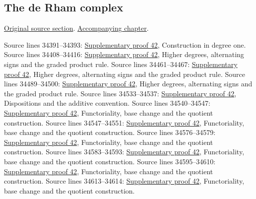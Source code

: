 \subsection{The de Rham complex}
\hypertarget{algebra-source-section-de-rham-complex}{}
\noindent\href{https://github.com/stacks/stacks-project/blob/a04446e57ec1fbc252a871afcec7752fb2807b14/algebra.tex\#L34387}{Original source section}. \href{algebra.pdf\#nameddest=section-de-rham-complex}{Accompanying chapter}.

\begin{AlgebraSourceRoutes}
 Source lines 34391--34393: \hyperlink{algebra_de_rham_notes_20260928}{Supplementary proof 42}, Construction in degree one.
 Source lines 34408--34416: \hyperlink{algebra_de_rham_notes_20260928}{Supplementary proof 42}, Higher degrees, alternating signs and the graded product rule.
 Source lines 34461--34467: \hyperlink{algebra_de_rham_notes_20260928}{Supplementary proof 42}, Higher degrees, alternating signs and the graded product rule.
 Source lines 34489--34500: \hyperlink{algebra_de_rham_notes_20260928}{Supplementary proof 42}, Higher degrees, alternating signs and the graded product rule.
 Source lines 34533--34537: \hyperlink{algebra_de_rham_notes_20260928}{Supplementary proof 42}, Dispositions and the additive convention.
 Source lines 34540--34547: \hyperlink{algebra_de_rham_notes_20260928}{Supplementary proof 42}, Functoriality, base change and the quotient construction.
 Source lines 34547--34551: \hyperlink{algebra_de_rham_notes_20260928}{Supplementary proof 42}, Functoriality, base change and the quotient construction.
 Source lines 34576--34579: \hyperlink{algebra_de_rham_notes_20260928}{Supplementary proof 42}, Functoriality, base change and the quotient construction.
 Source lines 34583--34593: \hyperlink{algebra_de_rham_notes_20260928}{Supplementary proof 42}, Functoriality, base change and the quotient construction.
 Source lines 34595--34610: \hyperlink{algebra_de_rham_notes_20260928}{Supplementary proof 42}, Functoriality, base change and the quotient construction.
 Source lines 34613--34614: \hyperlink{algebra_de_rham_notes_20260928}{Supplementary proof 42}, Functoriality, base change and the quotient construction.

\end{AlgebraSourceRoutes}
